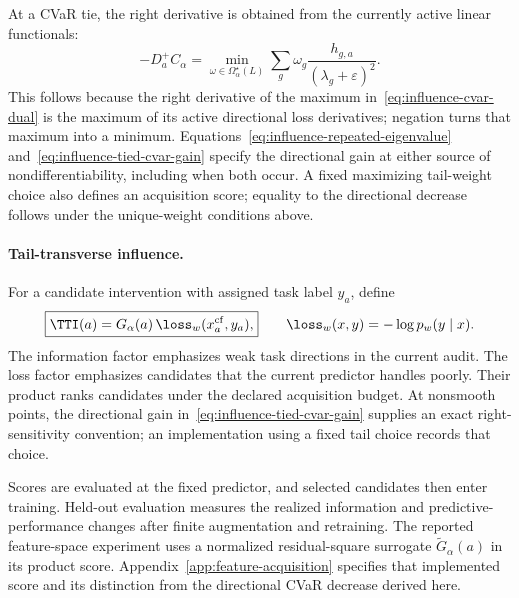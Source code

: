 At a CVaR tie, the right derivative is obtained from the currently active linear functionals:
\begin{equation}
-D_a^+C_\alpha
=\min_{\omega\in\Omega_\alpha^\star(L)}
\sum_g\omega_g\frac{h_{g,a}}{(\lambda_g+\varepsilon)^2}.
\label{eq:influence-tied-cvar-gain}
\end{equation}
This follows because the right derivative of the maximum in~\eqref{eq:influence-cvar-dual} is the maximum of its active directional loss derivatives; negation turns that maximum into a minimum. Equations~\eqref{eq:influence-repeated-eigenvalue} and~\eqref{eq:influence-tied-cvar-gain} specify the directional gain at either source of nondifferentiability, including when both occur. A fixed maximizing tail-weight choice also defines an acquisition score; equality to the directional decrease follows under the unique-weight conditions above.

\paragraph{Tail-transverse influence.}
For a candidate intervention with assigned task label $y_a$, define
\begin{equation}
\boxed{
\TTI(a)=G_\alpha(a)\,\loss_w(x_a^{\mathrm{cf}},y_a),
}
\qquad\loss_w(x,y)=-\log p_w(y\mid x).
\label{eq:tail-transverse-influence}
\end{equation}
The information factor emphasizes weak task directions in the current audit. The loss factor emphasizes candidates that the current predictor handles poorly. Their product ranks candidates under the declared acquisition budget. At nonsmooth points, the directional gain in~\eqref{eq:influence-tied-cvar-gain} supplies an exact right-sensitivity convention; an implementation using a fixed tail choice records that choice.

Scores are evaluated at the fixed predictor, and selected candidates then enter training. Held-out evaluation measures the realized information and predictive-performance changes after finite augmentation and retraining. The reported feature-space experiment uses a normalized residual-square surrogate $\widetilde G_\alpha(a)$ in its product score. Appendix~\ref{app:feature-acquisition} specifies that implemented score and its distinction from the directional CVaR decrease derived here.
